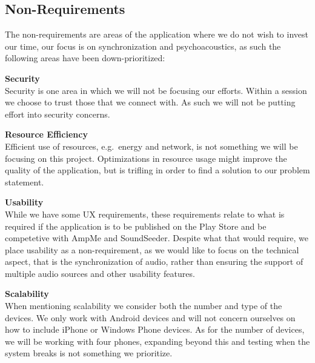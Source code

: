 \subsection*{Non-Requirements}\label{par:non_requirements}
The non-requirements are areas of the application where we do not wish to invest our time, our focus is on synchronization and psychoacoustics, as such the following areas have been down-prioritized:
\begin{eromanrate}
    \item \textbf{Security} \hfill\\
    Security is one area in which we will not be focusing our efforts.
    Within a session we choose to trust those that we connect with.
    As such we will not be putting effort into security concerns.
    \item \textbf{Resource Efficiency} \hfill\\
    Efficient use of resources, e.g.~energy and network, is not something we will be focusing on this project.
    Optimizations in resource usage might improve the quality of the application, but is trifling in order to find a solution to our problem statement.
    \item \textbf{Usability} \hfill\\
    While we have some \ac{UX} requirements, these requirements relate to what is required if the application is to be published on the Play Store and be competetive with AmpMe and SoundSeeder.
    Despite what that would require, we place usability as a non-requirement, as we would like to focus on the technical aspect, that is the synchronization of audio, rather than ensuring the support of multiple audio sources and other usability features.
    \item \textbf{Scalability} \hfill\\
    When mentioning scalability we consider both the number and type of the devices.
    We only work with Android devices and will not concern ourselves on how to include iPhone or Windows Phone devices.
    As for the number of devices, we will be working with four phones, expanding beyond this and testing when the system breaks is not something we prioritize.
\end{eromanrate}
